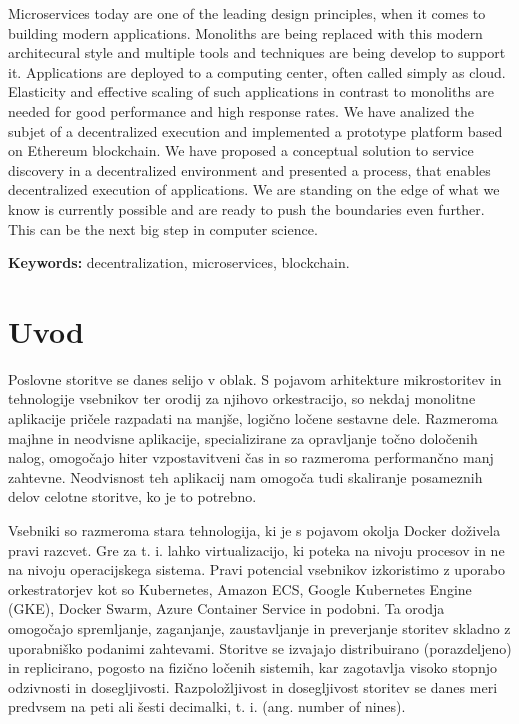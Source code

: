 \documentclass[a4paper, 12pt]{book}
\newcommand{\tkeywordsEn}{decentralization, microservices, blockchain}
\newcommand{\clearemptydoublepage}{\newpage{\pagestyle{empty}\cleardoublepage}}
\begin{document}
Microservices today are one of the leading design principles, when it comes to building modern applications.
Monoliths are being replaced with this modern architecural style and multiple tools and techniques are being develop to support it.
Applications are deployed to a computing center, often called simply as cloud.
Elasticity and effective scaling of such applications in contrast to monoliths are needed for good performance and high response rates.
We have analized the subjet of a decentralized execution and implemented a prototype platform based on Ethereum blockchain.
We have proposed a conceptual solution to service discovery in a decentralized environment and presented a process, that enables decentralized execution of applications.
We are standing on the edge of what we know is currently possible and are ready to push the boundaries even further. This can be the next big step in computer science.

\bigskip

\noindent\textbf{Keywords:} \tkeywordsEn.
\clearemptydoublepage

\mainmatter
\setcounter{page}{1}
\pagestyle{fancy}

\chapter{Uvod}
Poslovne storitve se danes selijo v oblak.
S pojavom arhitekture mikrostoritev in tehnologije vsebnikov ter orodij za njihovo orkestracijo, so nekdaj monolitne aplikacije  pričele razpadati na manjše, logično ločene sestavne dele.
Razmeroma majhne in neodvisne aplikacije, specializirane za opravljanje točno določenih nalog, omogočajo hiter vzpostavitveni čas in so razmeroma performančno manj zahtevne.
Neodvisnost teh aplikacij nam omogoča tudi skaliranje posameznih delov celotne storitve, ko je to potrebno.

Vsebniki so razmeroma stara tehnologija, ki je s pojavom okolja Docker doživela pravi razcvet.
Gre za t. i. lahko virtualizacijo, ki poteka na nivoju procesov in ne na nivoju operacijskega sistema.
Pravi potencial vsebnikov izkoristimo z uporabo orkestratorjev kot so Kubernetes, Amazon ECS, Google Kubernetes Engine (GKE), Docker Swarm, Azure Container Service in podobni.
Ta orodja omogočajo spremljanje, zaganjanje, zaustavljanje in preverjanje storitev skladno z uporabniško podanimi zahtevami.
Storitve se izvajajo distribuirano (porazdeljeno) in replicirano, pogosto na fizično ločenih sistemih, kar zagotavlja visoko stopnjo odzivnosti in dosegljivosti. Razpoložljivost in dosegljivost storitev se danes meri predvsem na peti ali šesti decimalki, t. i.  (ang. number of nines).
\end{document}
